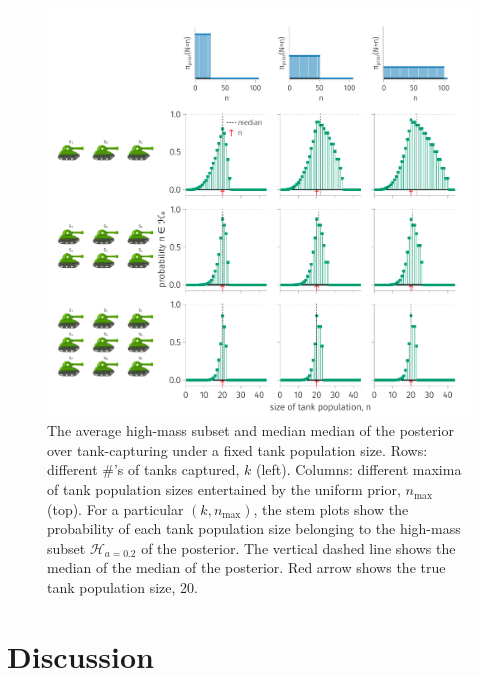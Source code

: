 \documentclass[11pt, oneside]{article}
\begin{document}
  \begin{figure}[h!]
        	\centering
        	\includegraphics[width=\textwidth]{gtp_fig4.pdf}
            \caption{
            The average high-mass subset and median median of the posterior over tank-capturing under a fixed tank population size. 
            Rows: different \#'s of tanks captured, $k$ (left).
            Columns: different maxima of tank population sizes entertained by the uniform prior, $n_{\text{max}}$ (top). 
            For a particular $(k, n_{\text{max}})$, the stem plots show the probability of each tank population size belonging to the high-mass subset $\mathcal{H}_{a=0.2}$ of the posterior. The vertical dashed line shows the median of the median of the posterior.
            Red arrow shows the true tank population size, 20. 
            	} \label{fig:H_a_study}
\end{figure}

\section{Discussion}
\end{document}
